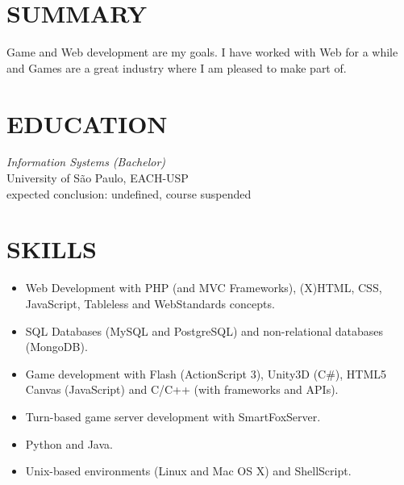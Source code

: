 \documentclass[line,margin]{res}
\begin{document}

\address{Av. Sete de Setembro, 1256 - Guarulhos - São Paulo}
\address{+55 11 999326440 - bruno@croci.me - \href{http://bruno.croci.me/}{http://bruno.croci.me/}}

 
\begin{resume}
 
\section{SUMMARY} Game and Web development are my goals. I have worked with Web for a while and Games are a great industry where I am pleased to make part of.
 
 
\section{EDUCATION} {\sl Information Systems (Bachelor)} \\
                University of São Paulo, EACH-USP \\
                expected conclusion: undefined, course suspended
                
 
\section{SKILLS} \begin{itemize}  \itemsep -3pt
                 \item Web Development with PHP (and MVC Frameworks), (X)HTML, CSS, JavaScript, 
                       Tableless and WebStandards concepts.
                 \item SQL Databases (MySQL and PostgreSQL) and non-relational databases (MongoDB).
                 \item Game development with Flash (ActionScript 3), Unity3D (C\#),
                       HTML5 Canvas (JavaScript) and C/C++ (with frameworks and APIs).
                 \item Turn-based game server development with SmartFoxServer.
                 \item Python and Java.
                 \item Unix-based environments (Linux and Mac OS X) and ShellScript.
                 \end{itemize}
 

\end{resume}
\end{document}

